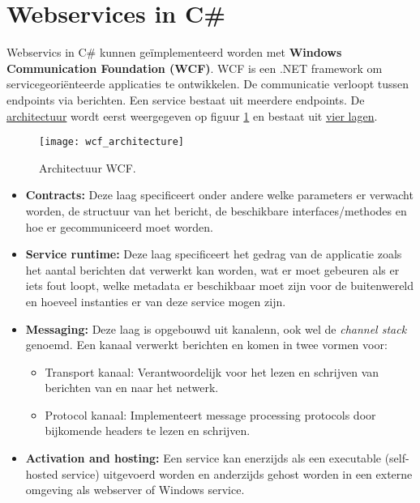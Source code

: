 \documentclass{report}
\begin{document}
\section{Webservices in C\#}
Webservics in C\# kunnen geïmplementeerd worden met \textbf{Windows Communication Foundation (WCF)}. WCF is een .NET framework om servicegeoriënteerde applicaties te ontwikkelen. De communicatie verloopt tussen endpoints via berichten. Een service bestaat uit meerdere endpoints. De \underline{architectuur} wordt eerst weergegeven op figuur \ref{fig:wcf_architecture} en bestaat uit \underline{vier lagen}.
\begin{figure}[ht]
	\centering
	\texttt{[image: wcf\_architecture]}
	\caption{Architectuur WCF.}
	\label{fig:wcf_architecture}
\end{figure}
\begin{itemize}
	\item[\info] \textbf{Contracts:} Deze laag specificeert onder andere welke parameters er verwacht worden, de structuur van het bericht, de beschikbare interfaces/methodes en hoe er gecommuniceerd moet worden.
	\item[\info] \textbf{Service runtime:} Deze laag specificeert het gedrag van de applicatie zoals het aantal berichten dat verwerkt kan worden, wat er moet gebeuren als er iets fout loopt, welke metadata er beschikbaar moet zijn voor de buitenwereld en hoeveel instanties er van deze service mogen zijn.
	\item[\info] \textbf{Messaging:} Deze laag is opgebouwd uit kanalenn, ook wel de \emph{channel stack} genoemd. Een kanaal verwerkt berichten en komen in twee vormen voor:
	\begin{itemize}
		\item Transport kanaal: Verantwoordelijk voor het lezen en schrijven van berichten van en naar het netwerk.
		\item Protocol kanaal: Implementeert message processing protocols door bijkomende headers te lezen en schrijven.
	\end{itemize}
	\item[\info] \textbf{Activation and hosting:} Een service kan enerzijds als een executable (self-hosted service) uitgevoerd worden en anderzijds gehost worden in een externe omgeving als webserver of Windows service.
\end{itemize}
\end{document}
